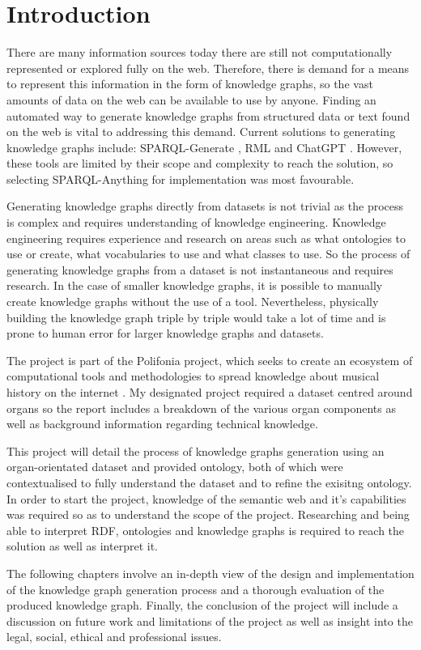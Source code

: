 \chapter{Introduction}
There are many information sources today there are still not computationally represented or explored fully on the web. Therefore, there is demand for a means to represent this information in the form of knowledge graphs, so the vast amounts of data on the web can be available to use by anyone. Finding an automated way to generate knowledge graphs from structured data or text found on the web is vital to addressing this demand. Current solutions to generating knowledge graphs include: SPARQL-Generate \cite{sparqlgenerate}, RML \cite{rml} and ChatGPT \cite{chatgptwebsite}. However, these tools are limited by their scope and complexity to reach the solution, so selecting SPARQL-Anything \cite{sparqlanythinggithub} for implementation was most favourable. 

Generating knowledge graphs directly from datasets is not trivial as the process is complex and requires understanding of knowledge engineering. Knowledge engineering requires experience and research on areas such as what ontologies to use or create, what vocabularies to use and what classes to use. So the process of generating knowledge graphs from a dataset is not instantaneous and requires research. In the case of smaller knowledge graphs, it is possible to manually create knowledge graphs without the use of a tool. Nevertheless, physically building the knowledge graph triple by triple would take a lot of time and is prone to human error for larger knowledge graphs and datasets. 

The project is part of the Polifonia project, which seeks to create an ecosystem of computational tools and methodologies to spread knowledge about musical history on the internet \cite{polifoniaproject}. My designated project required a dataset centred around organs so the report includes a breakdown of the various organ components as well as background information regarding technical knowledge. 

This project will detail the process of knowledge graphs generation using an organ-orientated dataset and provided ontology, both of which were contextualised to fully understand the dataset and to refine the exisitng ontology. In order to start the project, knowledge of the semantic web and it's capabilities was required so as to understand the scope of the project. Researching and being able to interpret RDF, ontologies and knowledge graphs is required to reach the solution as well as interpret it. 

The following chapters involve an in-depth view of the design and implementation of the knowledge graph generation process and a thorough evaluation of the produced knowledge graph. Finally, the conclusion of the project will include a discussion on future work and limitations of the project as well as insight into the legal, social, ethical and professional issues. 
